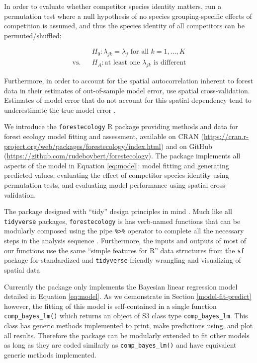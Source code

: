 \documentclass[12pt]{article}
\begin{document}
In order to evaluate whether competitor species identity matters,
\citet{allen_permutation_2020} run a permutation test where a null
hypothesis of no species grouping-specific effects of competition is
assumed, and thus the species identity of all competitors can be
permuted/shuffled:

\begin{eqnarray}
\label{eq:permutation-hypothesis-test}
&&H_0: \lambda_{jk} = \lambda_{j} \mbox{ for all } k = 1, \ldots, K\\
\text{vs.}&&H_A: \text{at least one } \lambda_{jk} \mbox{ is different}
\end{eqnarray}

Furthermore, in order to account for the spatial autocorrelation
inherent to forest data in their estimates of out-of-sample model error,
\citet{allen_permutation_2020} use spatial cross-validation. Estimates
of model error that do not account for this spatial dependency tend to
underestimate the true model error
\citep{roberts_cross-validation_2017}.

We introduce the \texttt{forestecology} R package providing methods and
data for forest ecology model fitting and assessment, available on CRAN
(\url{https://cran.r-project.org/web/packages/forestecology/index.html})
and on GitHub (\url{https://github.com/rudeboybert/forestecology}). The
package implements all aspects of the model in Equation \ref{eq:model}:
model fitting and generating predicted values, evaluating the effect of
competitor species identity using permutation tests, and evaluating
model performance using spatial cross-validation.

The package designed with ``tidy'' design principles in mind
\citep{wickham_welcome_2019}. Much like all \texttt{tidyverse} packages,
\texttt{forestecology} is has verb-named functions that can be modularly
composed using the pipe \texttt{\%\textgreater{}\%} operator to complete
all the necessary steps in the analysis sequence
\citep{bache_pipe_2020}. Furthermore, the inputs and outputs of most of
our functions use the same ``simple features for R'' data structures
from the \texttt{sf} package for standardized and
\texttt{tidyverse}-friendly wrangling and visualizing of spatial data
\citep{pebesma_simple_2018}

Currently the package only implements the Bayesian linear regression
model detailed in Equation \ref{eq:model}. As we demonstrate in Section
\ref{model-fit-predict} however, the fitting of this model is
self-contained in a single function \texttt{comp\_bayes\_lm()} which
returns an object of S3 class type \texttt{comp\_bayes\_lm}. This class
has generic methods implemented to print, make predictions using, and
plot all results. Therefore the package can be modularly extended to fit
other models as long as they are coded similarly as
\texttt{comp\_bayes\_lm()} and have equivalent generic methods
implemented.
\end{document}
